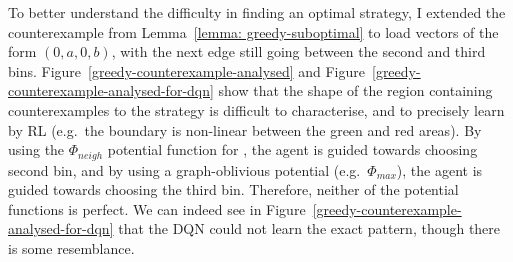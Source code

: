To better understand the difficulty in finding an optimal strategy, I extended the \CycleGraph counterexample from Lemma~\ref{lemma: greedy-suboptimal} to load vectors of the form $(0, a, 0, b)$, with the next edge still going between the second and third bins. Figure~\ref{greedy-counterexample-analysed} and Figure~\ref{greedy-counterexample-analysed-for-dqn} show that the shape of the region containing counterexamples to the \Greedy strategy is difficult to characterise, and to precisely learn by RL (e.g.\ the boundary is non-linear between the green and red areas). By using the $\Phi_{neigh}$ potential function for \DQL, the agent is guided towards choosing second bin, and by using a graph-oblivious potential (e.g.\ $\Phi_{max}$), the agent is guided towards choosing the third bin. Therefore, neither of the potential functions is perfect. We can indeed see in Figure~\ref{greedy-counterexample-analysed-for-dqn} that the DQN could not learn the exact pattern, though there is some resemblance.


